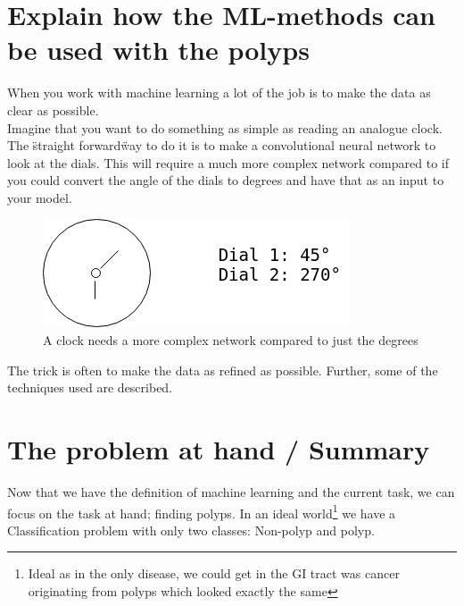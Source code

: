    



        
      
\section{Explain how the ML-methods can be used with the polyps}
    When you work with machine learning a lot of the job is to make the data as clear as possible. \\
    Imagine that you want to do something as simple as reading an analogue clock. The \"straight forward\" way to do it is to make a convolutional neural network to look at the dials. This will require a much more complex network compared to if you could convert the angle of the dials to degrees and have that as an input to your model.

    \begin{figure}[ht]
      \centering
      \includegraphics[scale=0.5]{methods/figures/Clock.png}
      \caption{A clock needs a more complex network compared to just the degrees}
    \end{figure}
    The trick is often to make the data as refined as possible. 
    Further, some of the techniques used are described.
    
    
    
      
      
\section{The problem at hand / Summary}
      Now that we have the definition of machine learning and the current task, we can focus on the task at hand; finding polyps. In an ideal world\footnote{Ideal as in the only disease, we could get in  the GI tract was cancer originating
      from polyps which looked exactly the same} we have a
      Classification problem with only two classes: Non-polyp and polyp. 
      
